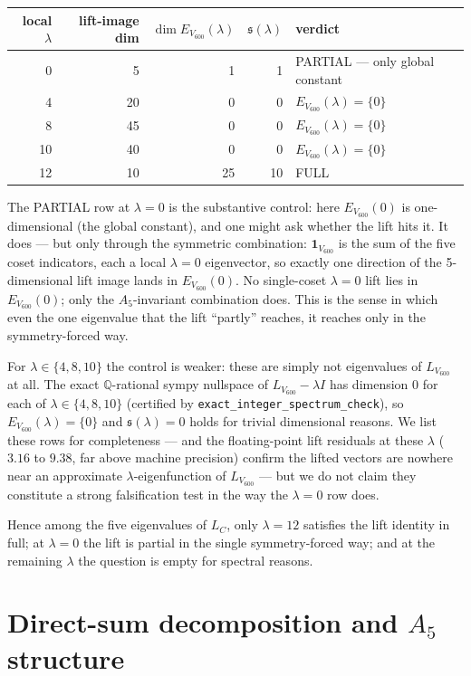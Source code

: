 \documentclass[11pt]{article}
\newcommand{\Vsix}{V_{600}}
\newcommand{\Lsix}{L_{\Vsix}}
\newcommand{\Loc}{L_{C}}
\newcommand{\Esix}{E_{\Vsix}}
\theoremstyle{plain}
\theoremstyle{definition}
\begin{document}
\begin{center}
\begin{tabular}{rrrrl}
\toprule
local $\lambda$ & lift-image dim & $\dim \Esix(\lambda)$ &
   $\mathfrak{s}(\lambda)$ & verdict \\
\midrule
0  & 5  & 1  & 1 & PARTIAL — only global constant \\
4  & 20 & 0  & 0 & $\Esix(\lambda) = \{0\}$ \\
8  & 45 & 0  & 0 & $\Esix(\lambda) = \{0\}$ \\
10 & 40 & 0  & 0 & $\Esix(\lambda) = \{0\}$ \\
12 & 10 & 25 & 10 & FULL \\
\bottomrule
\end{tabular}
\end{center}

The PARTIAL row at $\lambda{=}0$ is the substantive control: here
$\Esix(0)$ is one-dimensional (the global constant), and one might
ask whether the lift hits it.  It does --- but only through the
symmetric combination: $\mathbf{1}_{V_{600}}$ is the sum of the five
coset indicators, each a local $\lambda{=}0$ eigenvector, so exactly
one direction of the 5-dimensional lift image lands in $\Esix(0)$.
No single-coset $\lambda{=}0$ lift lies in $\Esix(0)$; only the
$A_5$-invariant combination does.  This is the sense in which even
the one eigenvalue that the lift ``partly'' reaches, it reaches only
in the symmetry-forced way.

For $\lambda\in\{4,8,10\}$ the control is weaker: these are simply
not eigenvalues of $\Lsix$ at all.  The exact $\mathbb{Q}$-rational
sympy nullspace of $\Lsix - \lambda I$ has dimension $0$ for each of
$\lambda\in\{4,8,10\}$ (certified by
\texttt{exact\_integer\_spectrum\_check}), so $\Esix(\lambda) = \{0\}$
and $\mathfrak{s}(\lambda) = 0$ holds for trivial dimensional reasons.
We list these rows for completeness --- and the floating-point lift
residuals at these $\lambda$ ($3.16$ to $9.38$, far above machine
precision) confirm the lifted vectors are nowhere near an
approximate $\lambda$-eigenfunction of $\Lsix$ --- but we do not
claim they constitute a strong falsification test in the way the
$\lambda{=}0$ row does.

Hence among the five eigenvalues of $\Loc$, only $\lambda{=}12$
satisfies the lift identity in full; at $\lambda{=}0$ the lift is
partial in the single symmetry-forced way; and at the remaining
$\lambda$ the question is empty for spectral reasons.

\section{Direct-sum decomposition and $A_5$ structure}\label{sec:a5}
\end{document}
